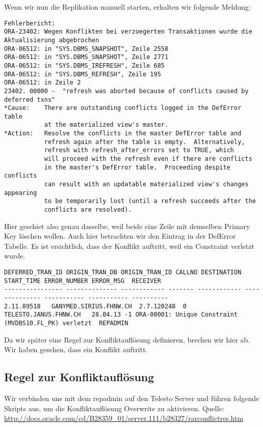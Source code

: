 \documentclass[11pt,a4paper,parskip=half]{scrartcl}
\begin{document}
Wenn wir nun die Replikation manuell starten, erhalten wir folgende Meldung:
\begin{lstlisting}
Fehlerbericht:
ORA-23402: Wegen Konflikten bei verzoegerten Transaktionen wurde die Aktualisierung abgebrochen
ORA-06512: in "SYS.DBMS_SNAPSHOT", Zeile 2558
ORA-06512: in "SYS.DBMS_SNAPSHOT", Zeile 2771
ORA-06512: in "SYS.DBMS_IREFRESH", Zeile 685
ORA-06512: in "SYS.DBMS_REFRESH", Zeile 195
ORA-06512: in Zeile 2
23402. 00000 -  "refresh was aborted because of conflicts caused by deferred txns"
*Cause:    There are outstanding conflicts logged in the DefError table
           at the materialized view's master.
*Action:   Resolve the conflicts in the master DefError table and
           refresh again after the table is empty.  Alternatively,
           refresh with refresh_after_errors set to TRUE, which
           will proceed with the refresh even if there are conflicts
           in the master's DefError table.  Proceeding despite conflicts
           can result with an updatable materialized view's changes appearing
           to be temporarily lost (until a refresh succeeds after the
           conflicts are resolved).
\end{lstlisting}

Hier geschiet also genau dasselbe, weil beide eine Zeile mit demselben Primary Key löschen wollen. Auch hier betrachten wir den Eintrag in der DefError Tabelle. Es ist ersichtlich, dass der Konflikt auftritt, weil ein Constraint verletzt wurde.
\begin{lstlisting}
DEFERRED_TRAN_ID ORIGIN_TRAN_DB ORIGIN_TRAN_ID CALLNO DESTINATION START_TIME ERROR_NUMBER ERROR_MSG  RECEIVER
---------------- -------------- ------------ ------- ------------ -------------- ----------- ----------- ----------
2.11.89518   GANYMED.SIRIUS.FHNW.CH  2.7.120248  0 TELESTO.JANUS.FHNW.CH   28.04.13 -1 ORA-00001: Unique Constraint (MVDBS10.FL_PK) verletzt  REPADMIN
\end{lstlisting}

Da wir später eine Regel zur Konfliktauflösung definieren, brechen wir hier ab. Wir haben gesehen, dass ein Konflikt auftritt.

\subsection{Regel zur Konfliktauflösung}
Wir verbinden uns mit dem repadmin auf den Telesto Server und führen folgende Skripts aus, um die Konfliktauflösung Overwrite zu aktivieren. Quelle: \url{http://docs.oracle.com/cd/B28359_01/server.111/b28327/rarconflictres.htm}
\end{document}
